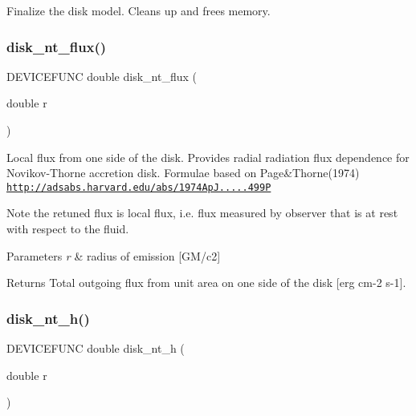 Finalize the disk model. Cleans up and frees memory. \mbox{\label{sim5disk-nt_8c_a1ad909d4e1c2190fe59faddc3767b475}} 
\subsubsection{\texorpdfstring{disk\+\_\+nt\+\_\+flux()}{disk\_nt\_flux()}}
{\footnotesize\ttfamily D\+E\+V\+I\+C\+E\+F\+U\+NC double disk\+\_\+nt\+\_\+flux (\begin{DoxyParamCaption}\item[{double}]{r }\end{DoxyParamCaption})}

Local flux from one side of the disk. Provides radial radiation flux dependence for Novikov-\/\+Thorne accretion disk. Formulae based on Page\&Thorne(1974) \href{http://adsabs.harvard.edu/abs/1974ApJ...191..499P}{\tt http\+://adsabs.\+harvard.\+edu/abs/1974\+Ap\+J.....\+499P}

Note the retuned flux is local flux, i.\+e. flux measured by observer that is at rest with respect to the fluid.


\begin{DoxyParams}{Parameters}
{\em r} & radius of emission \mbox{[}G\+M/c2\mbox{]}\\
\hline
\end{DoxyParams}
\begin{DoxyReturn}{Returns}
Total outgoing flux from unit area on one side of the disk \mbox{[}erg cm-\/2 s-\/1\mbox{]}. 
\end{DoxyReturn}
\mbox{\label{sim5disk-nt_8c_a9cd799d74b6b550d966e8a57447f1612}} 
\subsubsection{\texorpdfstring{disk\+\_\+nt\+\_\+h()}{disk\_nt\_h()}}
{\footnotesize\ttfamily D\+E\+V\+I\+C\+E\+F\+U\+NC double disk\+\_\+nt\+\_\+h (\begin{DoxyParamCaption}\item[{double}]{r }\end{DoxyParamCaption})}

